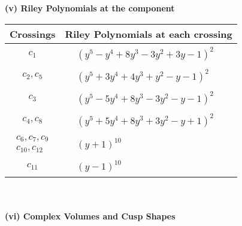 \documentclass[1p]{elsarticle_modified}
\theoremstyle{definition}
\begin{document}
\newpage\renewcommand{\arraystretch}{1}
\flushleft \textbf{(v) Riley Polynomials at the component}\newline \\
\begin{tabular}{m{50pt}|m{274pt}}
Crossings & \hspace{64pt}Riley Polynomials at each crossing \\
\hline $$\begin{aligned}c_{1}\end{aligned}$$&$\begin{aligned}
&(y^5- y^4+8 y^3-3 y^2+3 y-1)^2
\end{aligned}$\\
\hline $$\begin{aligned}c_{2},c_{5}\end{aligned}$$&$\begin{aligned}
&(y^5+3 y^4+4 y^3+y^2- y-1)^2
\end{aligned}$\\
\hline $$\begin{aligned}c_{3}\end{aligned}$$&$\begin{aligned}
&(y^5-5 y^4+8 y^3-3 y^2- y-1)^2
\end{aligned}$\\
\hline $$\begin{aligned}c_{4},c_{8}\end{aligned}$$&$\begin{aligned}
&(y^5+5 y^4+8 y^3+3 y^2- y+1)^2
\end{aligned}$\\
\hline $$\begin{aligned}c_{6},c_{7},c_{9}\\c_{10},c_{12}\end{aligned}$$&$\begin{aligned}
&(y+1)^{10}
\end{aligned}$\\
\hline $$\begin{aligned}c_{11}\end{aligned}$$&$\begin{aligned}
&(y-1)^{10}
\end{aligned}$\\
\hline
\end{tabular}\\~\\
\newpage\flushleft \textbf{(vi) Complex Volumes and Cusp Shapes}
\end{document}

